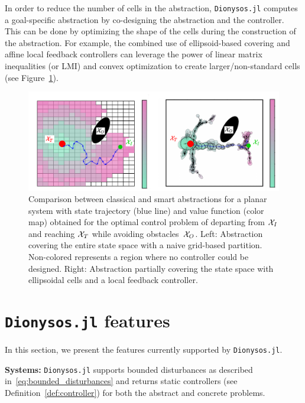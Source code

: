 \documentclass{juliacon}
\begin{document}
\vskip 6pt
In order to reduce the number of cells in the abstraction, \texttt{Dionysos.jl} computes a goal-specific abstraction by co-designing the abstraction and the controller.
This can be done by optimizing the shape of the cells 
during the construction of the abstraction.
For example, the combined use of ellipsoid-based covering and affine local feedback controllers can leverage the power of linear matrix inequalities (or LMI) and convex optimization to create larger/non-standard cells (see Figure~\ref{fig:Full-vs-Partial}).

\begin{figure}[t]
\centerline{\includegraphics[width=\linewidth]{Figures/Abstraction/Classical-vs-smart.pdf}}
\caption{Comparison between classical and smart abstractions for a planar system with state trajectory (blue line) and value function (color map) obtained for the optimal control problem of departing from $\mathcal{X}_I$ and reaching $\mathcal{X}_T$ while avoiding obstacles~$\mathcal{X}_O$. 
Left: Abstraction covering the entire state space with a naive grid-based partition. Non-colored represents a region where no controller could be designed. Right: Abstraction partially covering the state space with ellipsoidal cells and a local feedback controller.}
	\label{fig:Full-vs-Partial}
\end{figure}




\section{\texttt{Dionysos.jl} features}
\label{sec:functionalities}
In this section, we present the features currently supported by \texttt{Dionysos.jl}.

\vskip 6pt
\textbf{Systems:} 
\texttt{Dionysos.jl} supports bounded disturbances as described in~\eqref{eq:bounded_disturbances} and returns static controllers (see Definition~\ref{def:controller}) for both the abstract and concrete problems.
\end{document}
